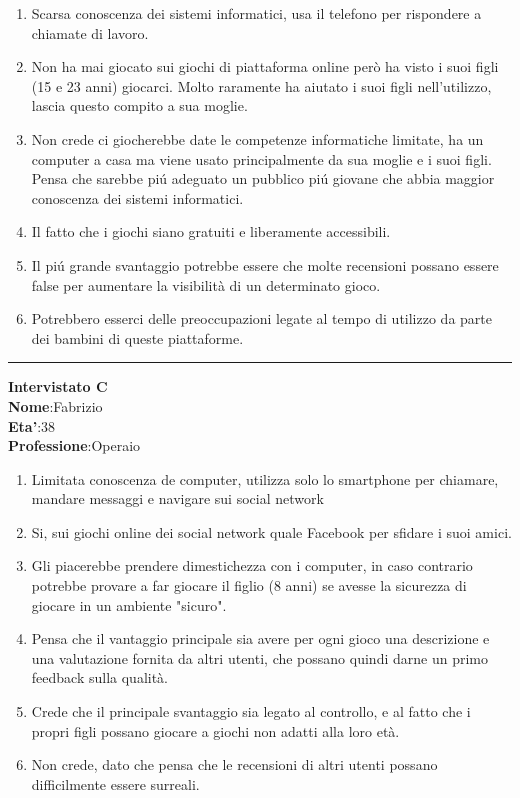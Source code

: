 \documentclass[../Report.tex]{subfiles}
\begin{document}
    \begin{enumerate}
        \item Scarsa conoscenza dei sistemi informatici, usa il telefono per rispondere a chiamate di lavoro.
        \item Non ha mai giocato sui giochi di piattaforma online però ha visto i suoi figli (15 e 23 anni) giocarci. Molto raramente ha aiutato i suoi figli nell'utilizzo, lascia questo compito a sua moglie. 
        \item Non crede ci giocherebbe date le competenze informatiche limitate, ha un computer a casa ma viene usato principalmente da sua moglie e i suoi figli. \\Pensa che sarebbe piú adeguato un pubblico piú giovane che abbia maggior conoscenza dei sistemi informatici.
        \item Il fatto che i giochi siano gratuiti e liberamente accessibili. 
        \item Il piú grande svantaggio potrebbe essere che molte recensioni possano essere false per aumentare la visibilità di un determinato gioco.
        \item Potrebbero esserci delle preoccupazioni legate al tempo di utilizzo da parte dei bambini di queste piattaforme.  
        
    \end{enumerate}
    \hrule
    \textbf{Intervistato C}\\
    
    \textbf{Nome}:Fabrizio\\
    \textbf{Eta'}:38\\
    \textbf{Professione}:Operaio

    \begin{enumerate}
        \item Limitata conoscenza de computer, utilizza solo lo smartphone per chiamare, mandare messaggi e navigare sui social network
        \item Si, sui giochi online dei social network quale Facebook per sfidare i suoi amici. 
        \item Gli piacerebbe prendere dimestichezza con i computer, in caso contrario potrebbe provare a far giocare il figlio (8 anni) se avesse la sicurezza di giocare in un ambiente "sicuro".
        \item Pensa che il vantaggio principale sia avere per ogni gioco una descrizione e una valutazione fornita da altri utenti, che possano quindi darne un primo feedback sulla qualità. 
        \item Crede che il principale svantaggio sia legato al controllo, e al fatto che i propri figli possano giocare a giochi non adatti alla loro età.
        \item Non crede, dato che pensa che le recensioni di altri utenti possano difficilmente essere surreali.
    \end{enumerate}
\end{document}
